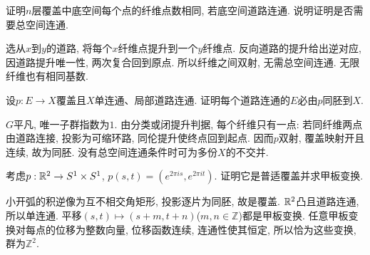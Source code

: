 \begin{exercise}
证明$n$层覆盖中底空间每个点的纤维点数相同, 若底空间道路连通. 说明证明是否需要总空间连通.
\end{exercise}
\begin{solution}
选从$x$到$y$的道路, 将每个$x$纤维点提升到一个$y$纤维点. 反向道路的提升给出逆对应, 因道路提升唯一性, 两次复合回到原点. 所以纤维之间双射, 无需总空间连通. 无限纤维也有相同基数.
\end{solution}
\begin{exercise}
设$p:E\to X$覆盖且$X$单连通、局部道路连通. 证明每个道路连通的$E$必由$p$同胚到$X$.
\end{exercise}
\begin{solution}
$G$平凡, 唯一子群指数为$1$. 由分类或闭提升判据, 每个纤维只有一点: 若同纤维两点由道路连接, 投影为可缩环路, 同伦提升使终点回到起点. 因而$p$双射, 覆盖映射开且连续, 故为同胚. 没有总空间连通条件时可为多份$X$的不交并.
\end{solution}
\begin{exercise}
考虑$p:\mathbb R^2\to S^1\times S^1$, $p(s,t)=(e^{2\pi is},e^{2\pi it})$. 证明它是普适覆盖并求甲板变换.
\end{exercise}
\begin{solution}
小开弧的积逆像为互不相交角矩形, 投影逐片为同胚, 故是覆盖. $\mathbb R^2$凸且道路连通, 所以单连通. 平移$(s,t)\mapsto(s+m,t+n)$($m,n\in\mathbb Z$)都是甲板变换. 任意甲板变换对每点的位移为整数向量, 位移函数连续, 连通性使其恒定, 所以恰为这些变换, 群为$\mathbb Z^2$.
\end{solution}
